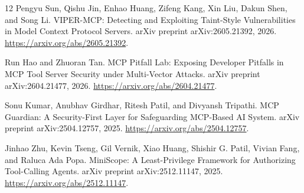 \documentclass[pdflatex,sn-mathphys-num]{sn-jnl}%
\theoremstyle{thmstyleone}%
\theoremstyle{thmstyletwo}%
\theoremstyle{thmstylethree}%
\begin{document}
\begin{thebibliography}{12}
Pengyu Sun, Qishu Jin, Enhao Huang, Zifeng Kang, Xin Liu, Dakun Shen, and Song Li.
\newblock VIPER-MCP: Detecting and Exploiting Taint-Style Vulnerabilities in Model Context Protocol Servers.
\newblock arXiv preprint arXiv:2605.21392, 2026. \url{https://arxiv.org/abs/2605.21392}.

Run Hao and Zhuoran Tan.
\newblock MCP Pitfall Lab: Exposing Developer Pitfalls in MCP Tool Server Security under Multi-Vector Attacks.
\newblock arXiv preprint arXiv:2604.21477, 2026. \url{https://arxiv.org/abs/2604.21477}.

Sonu Kumar, Anubhav Girdhar, Ritesh Patil, and Divyansh Tripathi.
\newblock MCP Guardian: A Security-First Layer for Safeguarding MCP-Based AI System.
\newblock arXiv preprint arXiv:2504.12757, 2025. \url{https://arxiv.org/abs/2504.12757}.

Jinhao Zhu, Kevin Tseng, Gil Vernik, Xiao Huang, Shishir G. Patil, Vivian Fang, and Raluca Ada Popa.
\newblock MiniScope: A Least-Privilege Framework for Authorizing Tool-Calling Agents.
\newblock arXiv preprint arXiv:2512.11147, 2025. \url{https://arxiv.org/abs/2512.11147}.

\end{thebibliography}
\end{document}
